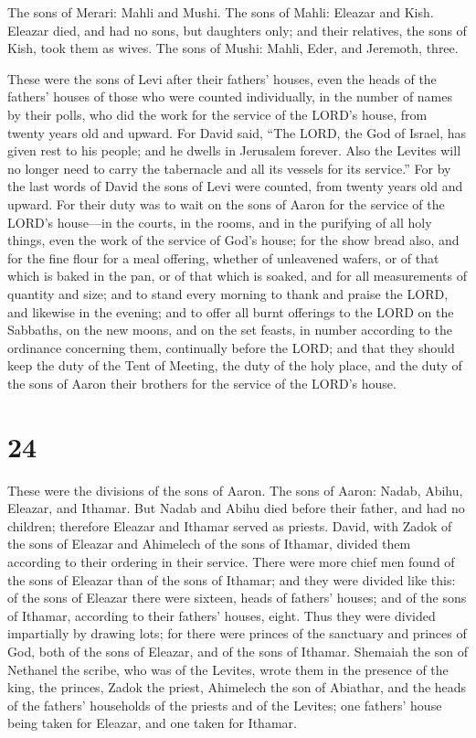  The sons of Merari: Mahli and Mushi. The sons of Mahli:
Eleazar and Kish.  Eleazar died, and had no sons, but
daughters only; and their relatives, the sons of Kish, took them as
wives.  The sons of Mushi: Mahli, Eder, and Jeremoth,
three.

 These were the sons of Levi after their fathers' houses,
even the heads of the fathers' houses of those who were counted
individually, in the number of names by their polls, who did the work
for the service of the LORD's house, from twenty years old and upward.
 For David said, ``The LORD, the God of Israel, has given
rest to his people; and he dwells in Jerusalem forever. 
Also the Levites will no longer need to carry the tabernacle and all its
vessels for its service.''  For by the last words of David
the sons of Levi were counted, from twenty years old and upward.
 For their duty was to wait on the sons of Aaron for the
service of the LORD's house---in the courts, in the rooms, and in the
purifying of all holy things, even the work of the service of God's
house;  for the show bread also, and for the fine flour for
a meal offering, whether of unleavened wafers, or of that which is baked
in the pan, or of that which is soaked, and for all measurements of
quantity and size;  and to stand every morning to thank and
praise the LORD, and likewise in the evening;  and to offer
all burnt offerings to the LORD on the Sabbaths, on the new moons, and
on the set feasts, in number according to the ordinance concerning them,
continually before the LORD;  and that they should keep the
duty of the Tent of Meeting, the duty of the holy place, and the duty of
the sons of Aaron their brothers for the service of the LORD's house.

\hypertarget{section-23}{%
\section{24}\label{section-23}}

 These were the divisions of the sons of Aaron. The sons of
Aaron: Nadab, Abihu, Eleazar, and Ithamar.  But Nadab and
Abihu died before their father, and had no children; therefore Eleazar
and Ithamar served as priests.  David, with Zadok of the
sons of Eleazar and Ahimelech of the sons of Ithamar, divided them
according to their ordering in their service.  There were
more chief men found of the sons of Eleazar than of the sons of Ithamar;
and they were divided like this: of the sons of Eleazar there were
sixteen, heads of fathers' houses; and of the sons of Ithamar, according
to their fathers' houses, eight.  Thus they were divided
impartially by drawing lots; for there were princes of the sanctuary and
princes of God, both of the sons of Eleazar, and of the sons of Ithamar.
 Shemaiah the son of Nethanel the scribe, who was of the
Levites, wrote them in the presence of the king, the princes, Zadok the
priest, Ahimelech the son of Abiathar, and the heads of the fathers'
households of the priests and of the Levites; one fathers' house being
taken for Eleazar, and one taken for Ithamar.


